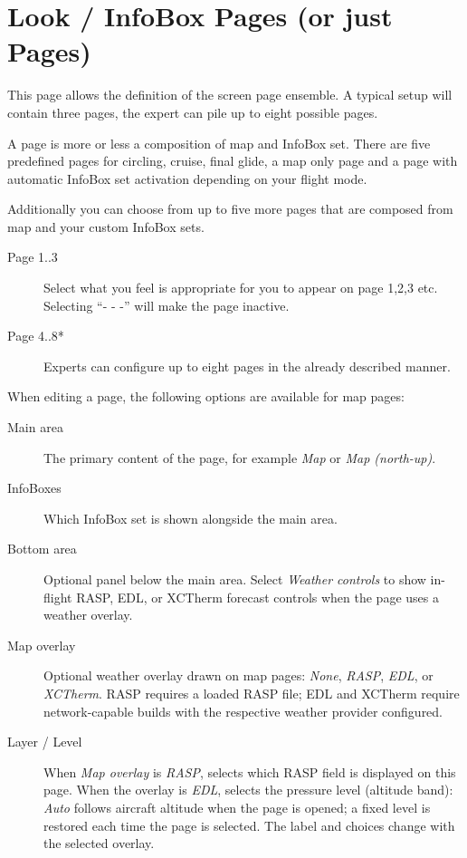 \section{Look / InfoBox Pages (or just Pages)}\label{conf:screenpages}

This page allows the definition of the screen page ensemble. A typical setup 
will contain three pages, the expert can pile up to eight possible pages.

A page is more or less a composition of map and InfoBox set. There are five 
predefined pages for circling, cruise, final glide, a map only page and a 
page with automatic InfoBox set activation depending on your flight mode.

Additionally you can choose from up to five more pages that are composed from map 
and your custom InfoBox sets.  

\begin{description}
\item[Page 1..3]  Select what you feel is appropriate for you to appear on page 1,2,3 etc. 
  Selecting ``- - -'' will make the page inactive.
\item[Page 4..8*]  Experts can configure up to eight pages in the already 
  described manner.
\end{description}

When editing a page, the following options are available for map pages:
\begin{description}
\item[Main area]  The primary content of the page, for example \emph{Map}
  or \emph{Map (north-up)}.
\item[InfoBoxes]  Which InfoBox set is shown alongside the main area.
\item[Bottom area]  Optional panel below the main area.  Select
  \emph{Weather controls} to show in-flight RASP, EDL, or XCTherm forecast
  controls when the page uses a weather overlay.
\item[Map overlay]  Optional weather overlay drawn on map pages: \emph{None},
  \emph{RASP}, \emph{EDL}, or \emph{XCTherm}.  RASP requires a loaded RASP
  file; EDL and XCTherm require network-capable builds with the respective
  weather provider configured.
\item[Layer / Level]  When \emph{Map overlay} is \emph{RASP}, selects
  which RASP field is displayed on this page.  When the overlay is
  \emph{EDL}, selects the pressure level (altitude band): \emph{Auto}
  follows aircraft altitude when the page is opened; a fixed level is
  restored each time the page is selected.  The label and choices
  change with the selected overlay.
\end{description}


